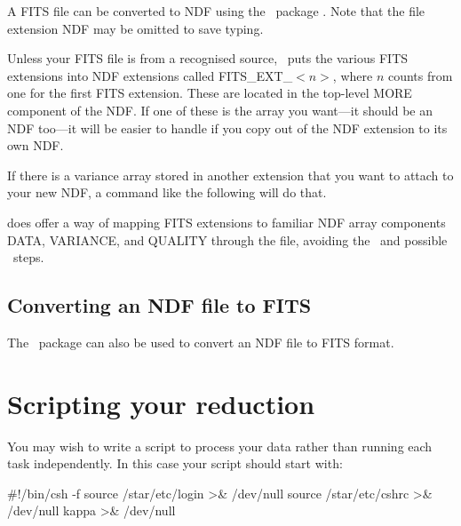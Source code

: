 \documentclass[11pt,oneside,chapters]{starlink}
\begin{document}
A FITS file can be converted to NDF using the \starlink\
package \convert. Note that the  file extension NDF may
be omitted to save typing.

\begin{terminalv}
\end{terminalv}

Unless your FITS file is from a recognised source, \fitstondf\ puts the
various FITS extensions into NDF extensions called FITS\_EXT\_$<n>$,
where $n$ counts from one for the first FITS extension. These are
located in the top-level MORE component of the NDF. If one of these is
the array you want---it should be an NDF too---it will be easier to
handle if you copy out of the NDF extension to its own NDF.

\begin{terminalv}
\end{terminalv}

If there is a variance array stored in another extension that you want
to attach to your new NDF, a command like the following will do that.

\begin{terminalv}
\end{terminalv}

 does offer a way of mapping FITS extensions to familiar NDF
array components DATA, VARIANCE, and QUALITY through the \param{EXTABLE} file,
avoiding the \ndfcopy\ and possible \setvar\ steps.

\section{Converting an NDF file to FITS}
The \convert\ package can also be used to convert an NDF file to FITS format.

\begin{terminalv}
\end{terminalv}


\newpage
\chapter{Scripting your reduction}
\label{app:script}
You may wish to write a script to process your data rather than
running each task independently. In this case your script should start
with:
\begin{terminalv}
#!/bin/csh -f
source /star/etc/login >& /dev/null
source /star/etc/cshrc >& /dev/null
kappa >& /dev/null
\end{terminalv}
\end{document}
